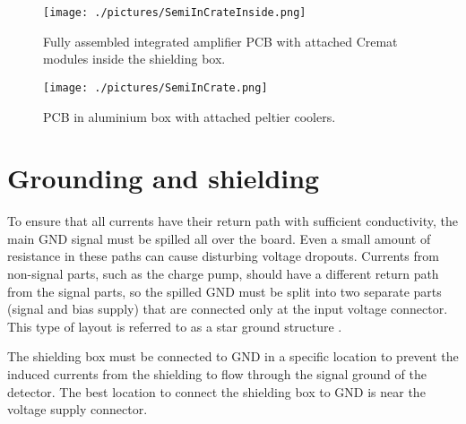 \begin{figure}[H]
 \centering
 \texttt{[image: ./pictures/SemiInCrateInside.png]}
 \caption{Fully assembled integrated amplifier PCB with attached Cremat modules inside the shielding box.}
 \label{PCBbox}
 
\end{figure}


\begin{figure}[H]
 \centering
 \texttt{[image: ./pictures/SemiInCrate.png]}
 \caption{PCB in aluminium box with attached peltier coolers.}
 \label{PCBphyss}
 
\end{figure}








\section{Grounding and shielding}
To ensure that all currents have their return path with sufficient conductivity, the main GND signal must be spilled all over the board. Even a small amount of resistance in these paths can cause disturbing voltage dropouts. Currents from non-signal parts, such as the charge pump, should have a different return path from the signal parts, so the spilled GND must be split into two separate parts (signal and bias supply) that are connected only at the input voltage connector. This type of layout is referred to as a star ground structure \cite{star}.
\par
The shielding box must be connected to GND in a specific location to prevent the induced currents from the shielding to flow through the signal ground of the detector. The best location to connect the shielding box to GND is near the voltage supply connector.


